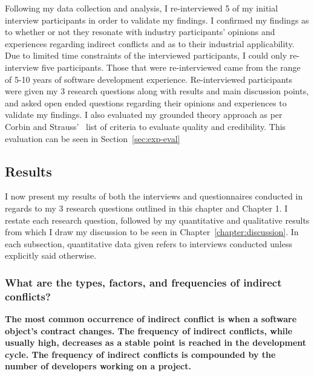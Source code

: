 Following my data collection and analysis, I re-interviewed 5 of my initial interview participants
in order to validate my findings. I confirmed my findings as to whether or not they resonate with 
industry participants' opinions and experiences regarding indirect conflicts and as to their industrial 
applicability. Due to limited time constraints of the interviewed participants, I could only re-interview
five participants. Those that were re-interviewed came from the range of 5-10 years of software development
experience. Re-interviewed participants were given my 3 research questions along with results and main
discussion points, and asked open ended questions regarding their opinions and experiences to validate my 
findings. I also evaluated my grounded theory approach as per Corbin and Strauss'~\cite{Corbin:1998:SP}
list of criteria to evaluate quality and credibility. This evaluation can be seen in Section~\ref{sec:exp-eval}

\subsection{Results}
\label{sec:exp-results}

I now present my results of both the interviews and questionnaires conducted in regards to my 3 research questions
outlined in this chapter and Chapter 1. I restate each research question, followed by my quantitative and qualitative
results from which I draw my discussion to be seen in Chapter~\ref{chapter:discussion}. In each subsection, quantitative data
given refers to interviews conducted unless explicitly said otherwise.

\subsubsection{What are the types, factors, and frequencies of indirect conflicts?}

\bf{The most common occurrence of indirect conflict is when a software object's contract changes. The frequency of
indirect conflicts, while usually high, decreases as a stable point is reached in the development cycle. The frequency
of indirect conflicts is compounded by the number of developers working on a project.}

\normalfont{}

